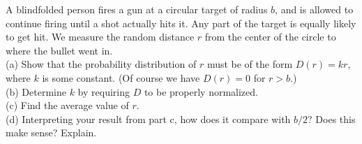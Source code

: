 A blindfolded person fires a gun at a circular target of radius $b$, and is
allowed to continue firing until a shot actually hits it. Any part of the
target is equally likely to get hit. We measure the random distance
$r$ from the center of the circle to where the bullet went in.\\
(a) Show that the probability distribution of $r$ must be of the
form $D(r)=kr$, where $k$ is some constant. (Of course we have
$D(r)=0$ for $r>b$.)\\
(b) Determine $k$ by requiring $D$ to be properly normalized.\answercheck\hwendpart\\
(c) Find the average value of $r$.\answercheck\hwendpart\\
(d) Interpreting your result from part c, how does it compare with
$b/2$? Does this make sense? Explain.

